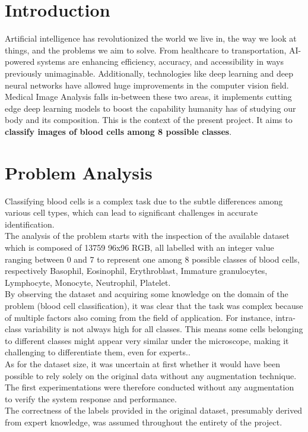 \documentclass[11pt]{article}
\begin{document}
    \begin{multicols}{2}
        
        \section{Introduction}
        Artificial intelligence has revolutionized the world we live in, the way we look at things, and the problems we aim to solve. From healthcare to transportation, AI-powered systems are enhancing efficiency, accuracy, and accessibility in ways previously unimaginable. Additionally, technologies like deep learning and deep neural networks have allowed huge improvements in the computer vision field. 
        \newline
Medical Image Analysis falls in-between these two areas, it implements cutting edge deep learning models to boost the capability humanity has of studying our body and its composition. This is the context of the present project. It aims to \textbf{classify images of blood cells among 8 possible classes}. 
        
        \section{Problem Analysis}

Classifying blood cells is a complex task due to the subtle differences among various cell types, which can lead to significant challenges in accurate identification.\\
	The analysis of the problem starts with the inspection of the available dataset which is composed of 13759 96x96 RGB, all labelled with an integer value ranging between 0 and 7 to represent one among 8 possible classes of blood cells, respectively Basophil, Eosinophil, Erythroblast, Immature granulocytes, Lymphocyte, Monocyte, Neutrophil, Platelet.\\
	By observing the dataset and acquiring some knowledge on the domain of the problem (blood cell classification), it was clear that the task was complex because of multiple factors also coming from the field of application. For instance, intra-class variability is not always high for all classes. This means some cells belonging to different classes might appear very similar under the microscope, making it challenging to differentiate them, even for experts..\\	
	 As for the dataset size, it was uncertain at first whether it would have been possible to rely solely on the original data without any augmentation technique. The first experimentations were therefore conducted without any augmentation to verify the system response and performance.\\	 
	The correctness of the labels provided in the original dataset, presumably derived from expert knowledge, was assumed throughout the entirety of the project.
	 


\end{multicols}
\end{document}
